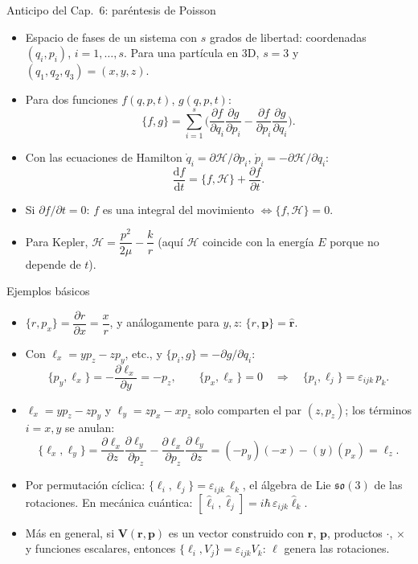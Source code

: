 \documentclass[aspectratio=169]{beamer}
\newcommand{\dd}{\mathrm{d}}
\newcommand{\vr}{\mathbf r}
\newcommand{\vp}{\mathbf p}
\newcommand{\vl}{\boldsymbol\ell}
\newcommand{\rh}{\hat{\mathbf r}}
\newcommand{\PB}[2]{\{#1,#2\}}
\newcommand{\Hc}{\mathcal H}
\begin{document}
\begin{frame}{Anticipo del Cap.~6: paréntesis de Poisson}
\small
\begin{itemize}
  \item<1-> Espacio de fases de un sistema con $s$ grados de libertad: coordenadas
        $(q_i,p_i)$, $i=1,\dots,s$. Para una partícula en 3D, $s=3$ y
        $(q_1,q_2,q_3)=(x,y,z)$.
  \item<2-> Para dos funciones $f(q,p,t)$, $g(q,p,t)$:
  \[
    \PB{f}{g}=\sum_{i=1}^{s}\Big(\frac{\partial f}{\partial q_i}\frac{\partial g}{\partial p_i}
      -\frac{\partial f}{\partial p_i}\frac{\partial g}{\partial q_i}\Big).
  \]
  \item<3-> Con las ecuaciones de Hamilton $\dot q_i=\partial\Hc/\partial p_i$,
        $\dot p_i=-\partial\Hc/\partial q_i$:
  \[
    \frac{\dd f}{\dd t}=\PB{f}{\Hc}+\frac{\partial f}{\partial t}.
  \]
  \item<4-> Si $\partial f/\partial t=0$: $f$ es una integral del movimiento
        $\iff\PB{f}{\Hc}=0$.
  \item<5-> Para Kepler, $\Hc=\dfrac{p^{2}}{2\mu}-\dfrac{k}{r}$ (aquí $\Hc$ coincide con la
        energía $E$ porque no depende de $t$).
\end{itemize}
\end{frame}

\begin{frame}{Ejemplos básicos}
\small
\begin{itemize}
  \item<1-> $\PB{r}{p_x}=\dfrac{\partial r}{\partial x}=\dfrac{x}{r}$, y análogamente para
        $y,z$: \; $\PB{r}{\vp}=\rh$.
  \item<2-> Con $\ell_x=yp_z-zp_y$, etc., y $\PB{p_i}{g}=-\partial g/\partial q_i$:
  \[
    \PB{p_y}{\ell_x}=-\frac{\partial\ell_x}{\partial y}=-p_z,\qquad
    \PB{p_x}{\ell_x}=0
    \quad\Longrightarrow\quad
    \PB{p_i}{\ell_j}=\varepsilon_{ijk}\,p_k .
  \]
  \item<3-> $\ell_x=yp_z-zp_y$ y $\ell_y=zp_x-xp_z$ solo comparten el par $(z,p_z)$;
        los términos $i=x,y$ se anulan:
  \[
    \PB{\ell_x}{\ell_y}
    =\frac{\partial\ell_x}{\partial z}\frac{\partial\ell_y}{\partial p_z}
     -\frac{\partial\ell_x}{\partial p_z}\frac{\partial\ell_y}{\partial z}
    =(-p_y)(-x)-(y)(p_x)=\ell_z .
  \]
  \item<4-> Por permutación cíclica: $\boxed{\PB{\ell_i}{\ell_j}=\varepsilon_{ijk}\,\ell_k}$,
        el álgebra de Lie $\mathfrak{so}(3)$ de las rotaciones. En mecánica cuántica:
        $[\hat\ell_i,\hat\ell_j]=i\hbar\,\varepsilon_{ijk}\hat\ell_k$.
  \item<5-> Más en general, si $\mathbf V(\vr,\vp)$ es un vector construido con $\vr$, $\vp$,
        productos $\cdot$, $\times$ y funciones escalares, entonces
        $\PB{\ell_i}{V_j}=\varepsilon_{ijk}V_k$: $\vl$ genera las rotaciones.
\end{itemize}
\end{frame}
\end{document}
